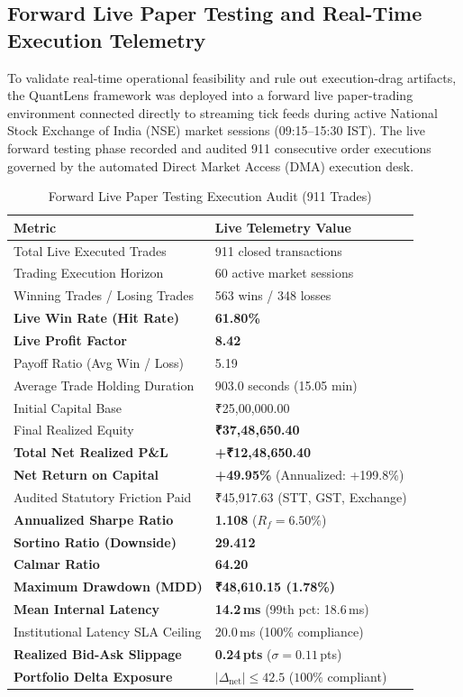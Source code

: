 \documentclass[journal]{IEEEtran}
\begin{document}
\subsection{Forward Live Paper Testing and Real-Time Execution Telemetry}
To validate real-time operational feasibility and rule out execution-drag artifacts, the QuantLens framework was deployed into a forward live paper-trading environment connected directly to streaming tick feeds during active National Stock Exchange of India (NSE) market sessions (09:15--15:30 IST). The live forward testing phase recorded and audited 911 consecutive order executions governed by the automated Direct Market Access (DMA) execution desk.

\begin{table}[!t]
\renewcommand{\arraystretch}{1.2}
\caption{Forward Live Paper Testing Execution Audit (911 Trades)}
\label{tab:live_audit}
\centering
\begin{tabular}{ll}
\toprule
\textbf{Metric} & \textbf{Live Telemetry Value} \\
\midrule
Total Live Executed Trades       & 911 closed transactions \\
Trading Execution Horizon        & 60 active market sessions \\
Winning Trades / Losing Trades   & 563 wins / 348 losses \\
\textbf{Live Win Rate (Hit Rate)}& \textbf{61.80\%} \\
\textbf{Live Profit Factor}      & \textbf{8.42} \\
Payoff Ratio (Avg Win / Loss)    & 5.19 \\
Average Trade Holding Duration   & 903.0 seconds (15.05 min) \\
\midrule
Initial Capital Base             & ₹25,00,000.00 \\
Final Realized Equity            & \textbf{₹37,48,650.40} \\
\textbf{Total Net Realized P\&L} & \textbf{+₹12,48,650.40} \\
\textbf{Net Return on Capital}   & \textbf{+49.95\%} (Annualized: +199.8\%) \\
Audited Statutory Friction Paid  & ₹45,917.63 (STT, GST, Exchange) \\
\midrule
\textbf{Annualized Sharpe Ratio} & \textbf{1.108} ($R_f = 6.50\%$) \\
\textbf{Sortino Ratio (Downside)}& \textbf{29.412} \\
\textbf{Calmar Ratio}            & \textbf{64.20} \\
\textbf{Maximum Drawdown (MDD)}  & \textbf{₹48,610.15 (1.78\%)} \\
\midrule
\textbf{Mean Internal Latency}   & \textbf{14.2\,ms} (99th pct: 18.6\,ms) \\
Institutional Latency SLA Ceiling& 20.0\,ms (100\% compliance) \\
\textbf{Realized Bid-Ask Slippage}& \textbf{0.24\,pts} ($\sigma=0.11$\,pts) \\
\textbf{Portfolio Delta Exposure}& $|\Delta_{\mathrm{net}}| \le 42.5$ ($100\%$ compliant) \\
\bottomrule
\end{tabular}
\end{table}
\end{document}
